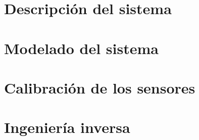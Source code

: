 \documentclass[spanish,12pt,a4paper,titlepage]{report}
\begin{document}

\part{Descripción del sistema}

\part{Modelado del sistema}


\part{Calibración de los sensores}





\part{Ingeniería inversa}




 

\end{document}
